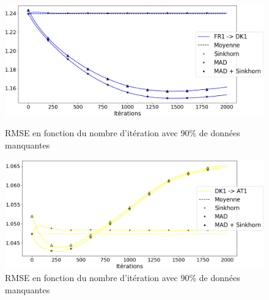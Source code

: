 \documentclass[acmsmall, natbib=false, nonacm]{acmart}
\begin{document}
\begin{figure}[H]
    \begin{minipage}[b]{0.4\linewidth}
		\centering \includegraphics[scale=0.14]{images/90_biais_DK1.png}
		\caption{RMSE en fonction du nombre d'itération avec 90\% de données manquantes}
	\end{minipage}\hfill
	\begin{minipage}[b]{0.4\linewidth}	
		\centering \includegraphics[scale=0.14]{images/90_biais_AT1.png}
		\caption{RMSE en fonction du nombre d'itération avec 90\% de données manquantes}
	\end{minipage}
\end{figure}
\end{document}
